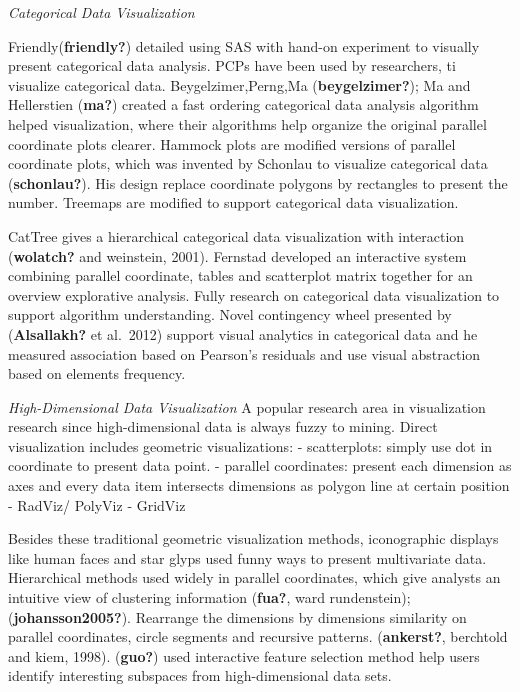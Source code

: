 \documentclass[print]{nuthesis}
\begin{document}
\emph{Categorical Data Visualization}

Friendly(\textbf{friendly?}) detailed using SAS with hand-on experiment to visually present categorical data analysis. PCPs have been used by researchers, ti visualize categorical data. Beygelzimer,Perng,Ma (\textbf{beygelzimer?}); Ma and Hellerstien (\textbf{ma?}) created a fast ordering categorical data analysis algorithm helped visualization, where their algorithms help organize the original parallel coordinate plots clearer. Hammock plots are modified versions of parallel coordinate plots, which was invented by Schonlau to visualize categorical data (\textbf{schonlau?}). His design replace coordinate polygons by rectangles to present the number. Treemaps are modified to support categorical data visualization.

CatTree gives a hierarchical categorical data visualization with interaction (\textbf{wolatch?} and weinstein, 2001). Fernstad developed an interactive system combining parallel coordinate, tables and scatterplot matrix together for an overview explorative analysis. Fully research on categorical data visualization to support algorithm understanding. Novel contingency wheel presented by (\textbf{Alsallakh?} et al.~2012) support visual analytics in categorical data and he measured association based on Pearson's residuals and use visual abstraction based on elements frequency.

\emph{High-Dimensional Data Visualization}
A popular research area in visualization research since high-dimensional data is always fuzzy to mining. Direct visualization includes geometric visualizations:
- scatterplots: simply use dot in coordinate to present data point.
- parallel coordinates: present each dimension as axes and every data item intersects dimensions as polygon line at certain position
- RadViz/ PolyViz
- GridViz

Besides these traditional geometric visualization methods, iconographic displays like human faces and star glyps used funny ways to present multivariate data. Hierarchical methods used widely in parallel coordinates, which give analysts an intuitive view of clustering information (\textbf{fua?}, ward rundenstein); (\textbf{johansson2005?}). Rearrange the dimensions by dimensions similarity on parallel coordinates, circle segments and recursive patterns. (\textbf{ankerst?}, berchtold and kiem, 1998). (\textbf{guo?}) used interactive feature selection method help users identify interesting subspaces from high-dimensional data sets.
\end{document}
